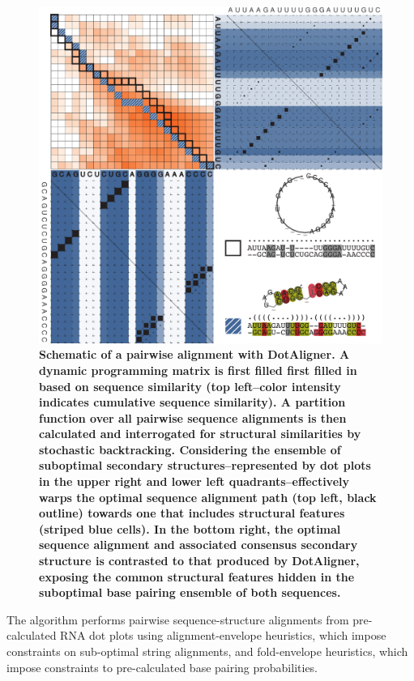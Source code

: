 \documentclass[a4paper,11pt]{article}
\begin{document}
\begin{figure}
 \includegraphics[width=\textwidth]{figX}
\caption \textbf{{Schematic of a pairwise alignment with DotAligner.} 
  A dynamic  programming matrix is first filled first filled in based on sequence 
  similarity (top left--color intensity indicates cumulative sequence similarity). 
  A partition function over all pairwise sequence alignments is then calculated and 
  interrogated for structural similarities by stochastic backtracking. Considering 
  the ensemble of suboptimal secondary structures--represented by dot plots in the 
  upper right and lower left quadrants--effectively warps the optimal sequence alignment 
  path (top left, black outline) towards one that includes structural features 
  (striped blue cells).  In the bottom right, the optimal sequence alignment 
  and associated consensus secondary structure is contrasted to that produced 
  by DotAligner, exposing the common structural features hidden in the suboptimal 
  base pairing ensemble of both sequences. 
 }
\end{figure}

The algorithm performs pairwise sequence-structure alignments from 
pre-calculated RNA dot plots using alignment-envelope heuristics, which 
impose constraints on sub-optimal string alignments, and fold-envelope 
heuristics, which impose constraints to pre-calculated base pairing probabilities.\\
\end{document}
